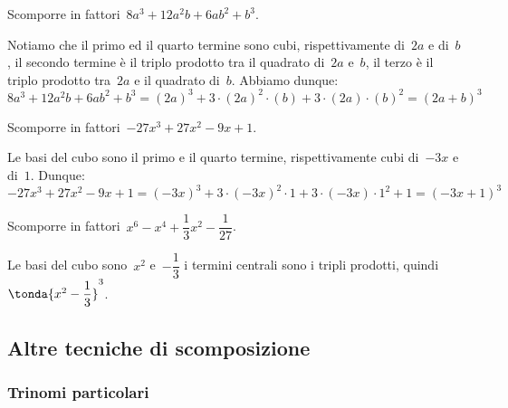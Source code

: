  \begin{esempio}
Scomporre in fattori~\(8a^{3}+12a^{2}b+6{ab}^{2}+b^{3}\).

Notiamo che il primo ed il quarto termine sono cubi, rispettivamente 
di~\(2a\) e di~\(b\), 
il secondo termine è il triplo prodotto tra il quadrato di~\(2a\) e~\(b\), 
il terzo è il triplo prodotto tra~\(2a\) e il quadrato di~\(b\).
Abbiamo dunque:
\[8a^{3}+12a^{2}b+6ab^{2}+b^{3}=
  (2a)^{3}+3\cdot (2a)^{2}\cdot (b)+3\cdot (2a)\cdot (b)^{2}=(2a+b)^{3}\]
 \end{esempio}

 \begin{esempio}
Scomporre in fattori~\(-27x^{3}+27x^{2}-9x+1\).

Le basi del cubo sono il primo e il quarto termine, rispettivamente cubi 
di~\(-3x\) e di~\(1\).
Dunque:
\[-27x^{3}+27x^{2}-9x+1=
  (-3x)^{3}+3\cdot (-3x)^{2}\cdot 1+3\cdot (-3x)\cdot 1^{2}+1=(-3x+1)^{3}\]
 \end{esempio}

 \begin{esempio}
Scomporre in fattori~\(x^{6}-x^{4}+\dfrac{1}{3}x^{2}-\dfrac{1}{27}\).

Le basi del cubo sono~\(x^{2}\) e~\(-\dfrac{1}{3}\) i termini centrali sono i 
tripli prodotti, quindi~\(\tonda{x^{2}-\dfrac{1}{3}}^{3}\).
\end{esempio}





\subsection{Altre tecniche di scomposizione}
\label{subsec:divpol_altretecniche}

\subsubsection{Trinomi particolari}
\label{subsubsec:trinpart}


